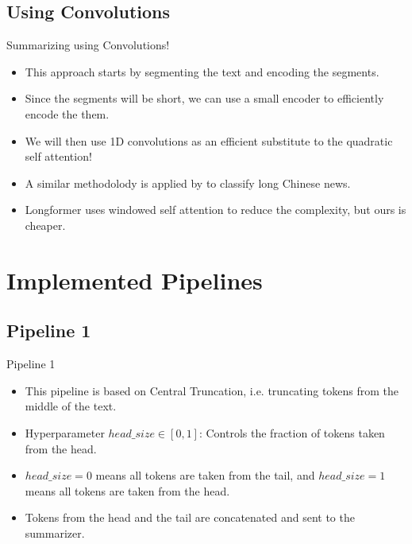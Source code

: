 \subsection{Using Convolutions}

\begin{frame}{Summarizing using Convolutions!}

	\begin{itemize}
		\item This approach starts by segmenting the text and encoding the segments.
		\item<2-> Since the segments will be short, we can use a small encoder to efficiently
		encode the them.
		\item<3-> We will then use 1D convolutions as an efficient substitute to the
		quadratic self attention!
		\item<4-> A similar methodolody is applied by \citet{chen2022long} to classify long
		Chinese news.
		\item<5> Longformer \citep{beltagy2020longformer} uses windowed self attention to
		reduce the complexity, but ours is cheaper.
	\end{itemize}
	
\end{frame}



\section{Implemented Pipelines}


\subsection{Pipeline 1}

\begin{frame}{Pipeline 1}

	\begin{itemize}
		\item This pipeline is based on Central Truncation, i.e. truncating
		tokens from the middle of the text.
		\item<2-> Hyperparameter $head\_size \in [0, 1]$: Controls the fraction
		of tokens taken from the head.
		\item<3-> $head\_size = 0$ means all tokens are taken from the tail, and
		$head\_size = 1$ means all tokens are taken from the head.
		\item<4-> Tokens from the head and the tail are concatenated and sent to the summarizer.
	\end{itemize}

\end{frame}


